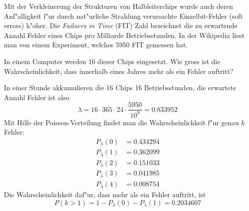 Mit der Verkleinerung der Strukturen von Halbleiterchips wurde auch deren
Anf"alligkeit f"ur durch nat"urliche Strahlung verursachte Einzelbit-Fehler
(soft errors)
h"oher.
Die {\em Failuers in Time} (FIT) Zahl bezeichnet die zu erwartende Anzahl
Fehler eines Chips pro Milliarde Betriebsstunden.
In der Wikipedia liest man von einem Experiment, welches 5950 FIT
gemessen hat.

In einem Computer werden 16 dieser Chips eingesetzt.
Wie gross ist die Wahrscheinlichkeit, dass innerhalb eines
Jahres mehr als ein Fehler auftritt?

\begin{loesung}
In einer Stunde akkumulieren die 16 Chips 16 Betriebsstunden, die erwartete
Anzahl Fehler ist also
\[
\lambda = 16\cdot365\cdot 24 \cdot \frac{5950}{10^{9}}=0.833952
\]
Mit Hilfe der Poisson-Verteilung findet man die Wahrscheinlichkeit f"ur
genau $k$ Fehler:
\begin{align*}
P_{\lambda}(0)&=0.434294\\
P_{\lambda}(1)&=0.362099\\
P_{\lambda}(2)&=0.151033\\
P_{\lambda}(3)&=0.041985\\
P_{\lambda}(4)&=0.008754
\end{align*}
Die Wahrscheinlichkeit daf"ur, dass mehr als ein Fehler auftritt, ist
\[
P(k > 1)=1-P_\lambda(0)-P_\lambda(1)=0.2034607
\]
\end{loesung}


